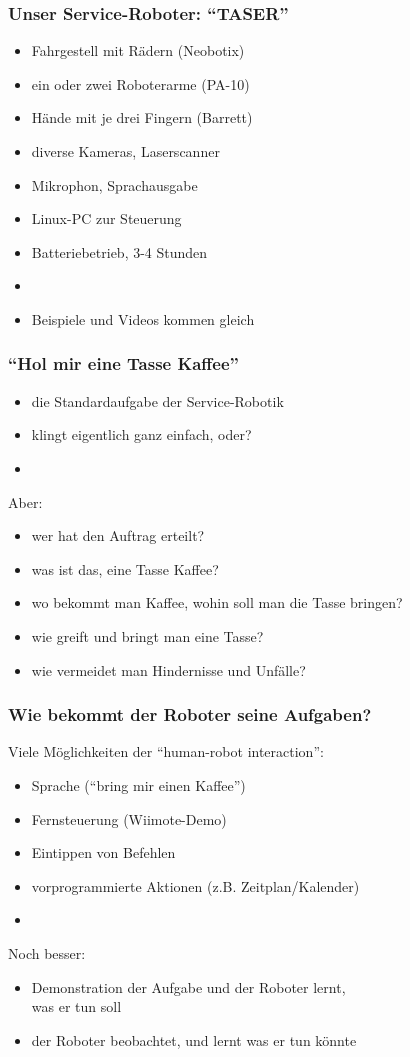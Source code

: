 \documentclass[t]{beamer}
\def\ii{\item[]}
\begin{document}
\begin{frame}
\frametitle{Unser Service-Roboter: "`TASER"'}
\begin{itemize}
\item Fahrgestell mit Rädern (Neobotix)
\item ein oder zwei Roboterarme (PA-10)
\item Hände mit je drei Fingern (Barrett)
\item diverse Kameras, Laserscanner
\item Mikrophon, Sprachausgabe
\item Linux-PC zur Steuerung
\item Batteriebetrieb, 3-4 Stunden
\ii
\item Beispiele und Videos kommen gleich 
\end{itemize}
\end{frame}



\begin{frame}
\frametitle{"`Hol mir eine Tasse Kaffee"'}
\begin{itemize}
\item die Standardaufgabe der Service-Robotik
\item klingt eigentlich ganz einfach, oder?
\item[]
\end{itemize}
Aber:
\begin{itemize}
\item wer hat den Auftrag erteilt?
\item was ist das, eine Tasse Kaffee?
\item wo bekommt man Kaffee, wohin soll man die Tasse bringen?
\item wie greift und bringt man eine Tasse?
\item wie vermeidet man Hindernisse und Unfälle?
\end{itemize}
\end{frame}


\begin{frame}
\frametitle{Wie bekommt der Roboter seine Aufgaben? }
Viele Möglichkeiten der "`human-robot interaction"':
\begin{itemize}
\item Sprache            \hfill ("`bring mir einen Kaffee"')
\item Fernsteuerung      \hfill (Wiimote-Demo)
\item Eintippen von Befehlen   
\item vorprogrammierte Aktionen \hfill (z.B. Zeitplan/Kalender)
\item[]
\end{itemize}
Noch besser:
\begin{itemize}
\item Demonstration der Aufgabe und der Roboter lernt,\\
      was er tun soll 
\item der Roboter beobachtet, und lernt was er tun könnte
\end{itemize}
\end{frame}
\end{document}

